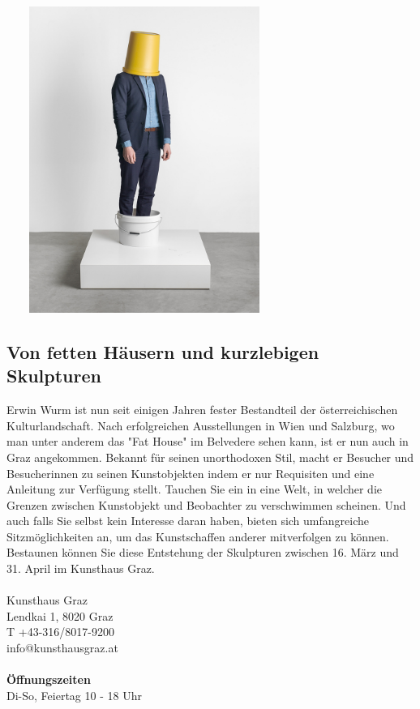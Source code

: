 \documentclass{article}
\begin{document}
\begin{multicols}{2}
	\columnbreak
	\includegraphics[width=90mm, height=100mm]{Eimer.jpg} \\
	\subsection*{Von fetten Häusern und kurzlebigen Skulpturen}
	Erwin Wurm ist nun seit einigen Jahren fester Bestandteil der österreichischen Kulturlandschaft. Nach erfolgreichen Ausstellungen in Wien und Salzburg, wo man unter anderem das "Fat House" im Belvedere sehen kann, ist er nun auch in Graz angekommen. Bekannt für seinen unorthodoxen Stil, macht er Besucher und Besucherinnen zu seinen Kunstobjekten indem er nur Requisiten und eine Anleitung zur Verfügung stellt. Tauchen Sie ein in eine Welt, in welcher die Grenzen zwischen Kunstobjekt und Beobachter zu verschwimmen scheinen. Und auch falls Sie selbst kein Interesse daran haben, bieten sich umfangreiche Sitzmöglichkeiten an, um das Kunstschaffen anderer mitverfolgen zu können. Bestaunen können Sie diese Entstehung der Skulpturen zwischen 16. März und 31. April im Kunsthaus Graz.\\ \\
	Kunsthaus Graz \\
	Lendkai 1, 8020 Graz \\
	T +43-316/8017-9200 \\
	info@kunsthausgraz.at \\ \\
	\textbf{Öffnungszeiten} \\
	Di-So, Feiertag 10 - 18 Uhr \\
	\end{multicols}
	
\end{document}
